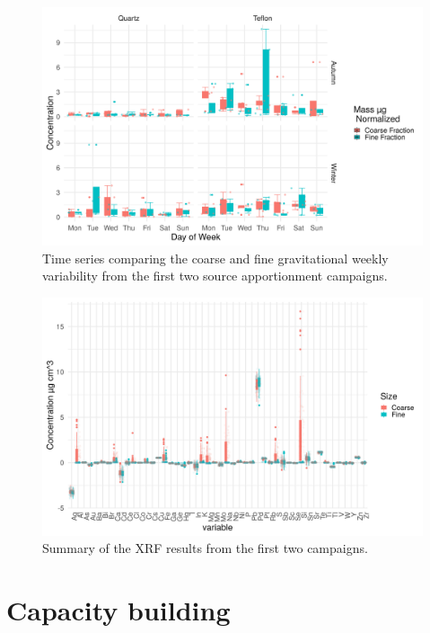 \documentclass{nwureport}
\begin{document}
\begin{figure}[!htb]
    \centering
    \includegraphics[width=\textwidth]{images/TS_FilterDaySizeSeason_mass.png}
    \caption{Time series comparing the coarse and fine gravitational weekly variability from the first two source apportionment campaigns.}
    \label{fig:coarse-vs-fine}
\end{figure}


\begin{figure}[!htb]
    \centering
    \includegraphics[width=\textwidth]{images/xrf.png}
    \caption{Summary of the XRF results from the first two campaigns.}
    \label{fig:xrf-summary}
\end{figure}

\chapter{Capacity building}
\label{sec:capacity}
\end{document}

